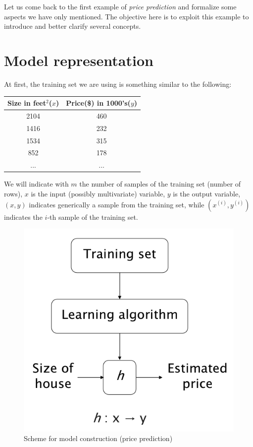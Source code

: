 Let us come back to the first example of \textit{price prediction} and formalize some aspects we have only mentioned. The objective here is to exploit this example to introduce and better clarify several concepts.\\
\section{Model representation}
At first, the training set we are using is something similar to the following:

\begin{table}[h]
    \centering
    \begin{tabular}{c c}
        \textbf{Size in feet$^2$($x$)}&\textbf{\color{red}Price(\$) in 1000's($y$)}\\
        \hline
        2104&460\\
        1416&232\\
        1534&315\\
        852&178\\
        ...&...
    \end{tabular}
\end{table}
\noindent
We will indicate with $m$ the number of samples of the training set (number of rows), $x$ is the input (possibly multivariate) variable, $y$ is the output variable, $(x,y)$ indicates generically a sample from the training set, while $(x^{(i)}, y^{(i)})$ indicates the $i$-th sample of the training set.

\begin{figure}[h]
    \centering
    \label{}
    \includegraphics[scale=0.5]{img/model.png}
    \caption{Scheme for model construction (price prediction)}
\end{figure}

